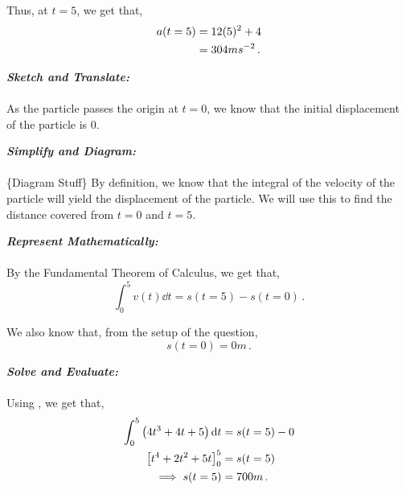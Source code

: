 \begin{subquestions}
\begin{subsubquestions}
Thus, at $t=5$, we get that,
\begin{align}
	a(t=5) & = 12(5)^2 + 4 \nonumber \\
	       & = 304 ms^{-2} \,.
\end{align}


\subsubquestion

\textbf{\textit{Sketch and Translate:}} \\ \\
As the particle passes the origin at $t=0$, we know that the initial displacement of the particle is 0.




\textbf{\textit{Simplify and Diagram:}} \\ \\
\{Diagram Stuff\}
By definition, we know that the integral of the velocity of the particle will yield the displacement of the particle. We will use this to find the distance covered from $t=0$ and $t=5$.




\textbf{\textit{Represent Mathematically:}} \\ \\
By the Fundamental Theorem of Calculus, we get that,
\begin{equation}
	\int_{0}^{5} v(t) \dd t = s(t=5)-s(t=0) \label{2005:q5:FTC1} \,.
\end{equation}

We also know that, from the setup of the question,
\begin{equation}
	s(t=0) = 0m \,.
\end{equation}




\textbf{\textit{Solve and Evaluate:}} \\ \\
Using , we get that,
\begin{align}
	\int_{0}^{5} \left(4t^3+4t+5\right) \mathrm{d} t & = s(t=5)-0 \nonumber \\
	\left[t^4+2t^2+5t\right]^5_0 & = s(t=5) \nonumber \\
	\implies s(t=5) & = 700m \,.
\end{align}

\end{subsubquestions}



\end{subquestions}
